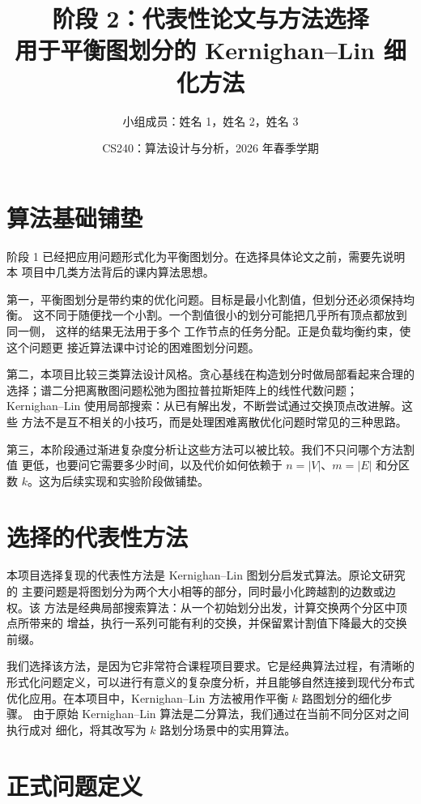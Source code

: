\documentclass[UTF8, 11pt]{ctexart}
\title{\textbf{阶段 2：代表性论文与方法选择}\\
用于平衡图划分的 Kernighan--Lin 细化方法}
\author{小组成员：姓名 1，姓名 2，姓名 3}
\date{CS240：算法设计与分析，2026 年春季学期}
\begin{document}
\maketitle

\section{算法基础铺垫}

阶段 1 已经把应用问题形式化为平衡图划分。在选择具体论文之前，需要先说明本
项目中几类方法背后的课内算法思想。

第一，平衡图划分是带约束的优化问题。目标是最小化割值，但划分还必须保持均衡。
这不同于随便找一个小割。一个割值很小的划分可能把几乎所有顶点都放到同一侧，
这样的结果无法用于多个 工作节点的任务分配。正是负载均衡约束，使这个问题更
接近算法课中讨论的困难图划分问题。

第二，本项目比较三类算法设计风格。贪心基线在构造划分时做局部看起来合理的
选择；谱二分把离散图问题松弛为图拉普拉斯矩阵上的线性代数问题；
Kernighan--Lin 使用局部搜索：从已有解出发，不断尝试通过交换顶点改进解。这些
方法不是互不相关的小技巧，而是处理困难离散优化问题时常见的三种思路。

第三，本阶段通过渐进复杂度分析让这些方法可以被比较。我们不只问哪个方法割值
更低，也要问它需要多少时间，以及代价如何依赖于 $n=|V|$、$m=|E|$ 和分区数
$k$。这为后续实现和实验阶段做铺垫。

\section{选择的代表性方法}

本项目选择复现的代表性方法是 Kernighan--Lin 图划分启发式算法。原论文研究的
主要问题是将图划分为两个大小相等的部分，同时最小化跨越割的边数或边权。该
方法是经典局部搜索算法：从一个初始划分出发，计算交换两个分区中顶点所带来的
增益，执行一系列可能有利的交换，并保留累计割值下降最大的交换前缀。

我们选择该方法，是因为它非常符合课程项目要求。它是经典算法过程，有清晰的
形式化问题定义，可以进行有意义的复杂度分析，并且能够自然连接到现代分布式
优化应用。在本项目中，Kernighan--Lin 方法被用作平衡 $k$ 路图划分的细化步骤。
由于原始 Kernighan--Lin 算法是二分算法，我们通过在当前不同分区对之间执行成对
细化，将其改写为 $k$ 路划分场景中的实用算法。

\section{正式问题定义}
\end{document}
